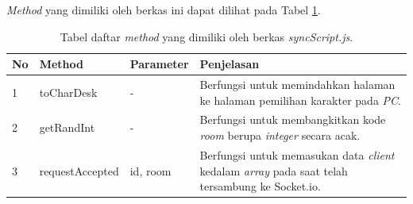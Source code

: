 \begin{enumerate}
\begin{enumerate}
\begin{enumerate}
			\textit{Method} yang dimiliki oleh berkas ini dapat dilihat pada Tabel \ref{table:method_syncScript}.
			\begin{table}[H]
				\centering
				\caption{Tabel daftar \textit{method} yang dimiliki oleh berkas \textit{syncScript.js}.}
				\begin{tabular}{|p{0.35cm}|p{3cm}|p{3cm}|p{7cm}|}
					\hline
					No & Method & Parameter &  Penjelasan \\ \hline
					1 & toCharDesk & - & Berfungsi untuk memindahkan halaman ke halaman pemilihan karakter pada \textit{PC}. \\ \hline
					2 & getRandInt & - & Berfungsi untuk membangkitkan kode \textit{room} berupa \textit{integer} secara acak. \\ \hline
					3 & requestAccepted & id, room & Berfungsi untuk memasukan data \textit{client} kedalam \textit{array} pada saat telah tersambung ke Socket.io. \\ \hline
				\end{tabular}
				\label{table:method_syncScript}
			\end{table}
%				
%				
			

\end{enumerate}
\end{enumerate}
\end{enumerate}
